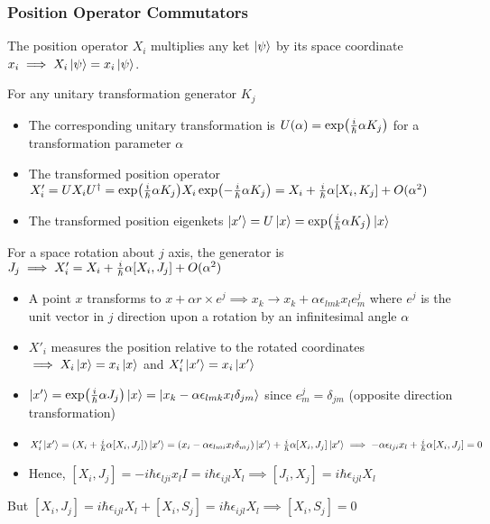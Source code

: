 \documentclass[8pt,t,mathserif,aspectratio=169]{beamer}
\begin{document}
\begin{frame}
  \frametitle{Position Operator Commutators}
  \vspace{1mm}
  The position operator $X_i$ multiplies any ket $\ket{\psi}$ by its space coordinate $x_i \implies X_i \ket{\psi} = x_i \ket{\psi}$. 

  For any unitary transformation generator $K_j$
  \begin{itemize}
    \item The corresponding unitary transformation is $U(\alpha) = \exp({i \over \hbar} \alpha K_j)$ for a transformation parameter $\alpha$
    \item The transformed position operator $X'_i = U X_i U^{\dagger} = \exp({i \over \hbar} \alpha K_j) X_i \exp(-{i \over \hbar} \alpha K_j) = X_i + {i \over \hbar} \alpha [X_i,K_j] + O(\alpha^2)$
    \item The transformed position eigenkets $\ket{x'} = U \ket{x} = \exp({i \over \hbar} \alpha K_j) \ket{x}$
  \end{itemize}
  For a space rotation about $j$ axis, the generator is $J_j \implies X'_i = X_i + {i \over \hbar} \alpha [X_i,J_j] + O(\alpha^2)$
  \begin{itemize}
    \item A point $x$ transforms to $x + \alpha r \times e^j \implies x_k \to x_k + \alpha \epsilon_{lmk} x_l e^j_m$ where $e^j$ is the unit vector in $j$ direction upon a rotation by an infinitesimal angle $\alpha$
    \item $X'_i$ measures the position relative to the rotated coordinates $\implies X_i \ket{x} = x_i \ket{x}$ and $X'_i \ket{x'} = x_i \ket{x'}$
    \item $\ket{x'} = \exp({i \over \hbar} \alpha J_j) \ket{x} = \ket{x_k - \alpha \epsilon_{lmk} x_l \delta_{jm}}$ since $e^j_m = \delta_{jm}$ (opposite direction transformation)
    \item $X'_i \ket{x'} = (X_i + {i \over \hbar} \alpha [X_i,J_j])\ket{x'} = (x_i - \alpha \epsilon_{lmi} x_l \delta_{mj})\ket{x'} + {i \over \hbar} \alpha [X_i,J_j] \ket{x'} \implies -\alpha \epsilon_{lji} x_l + {i \over \hbar} \alpha [X_i,J_j] = 0$
    \item Hence, $[X_i,J_j] = -i \hbar \epsilon_{lji} x_l I = i \hbar \epsilon_{ijl} X_l \implies [J_i,X_j] = i \hbar \epsilon_{ijl} X_l$
  \end{itemize}
  But $[X_i,J_j] = i \hbar \epsilon_{ijl} X_l + [X_i,S_j] = i \hbar \epsilon_{ijl} X_l \implies [X_i,S_j] = 0$ 
\end{frame}
\end{document}
